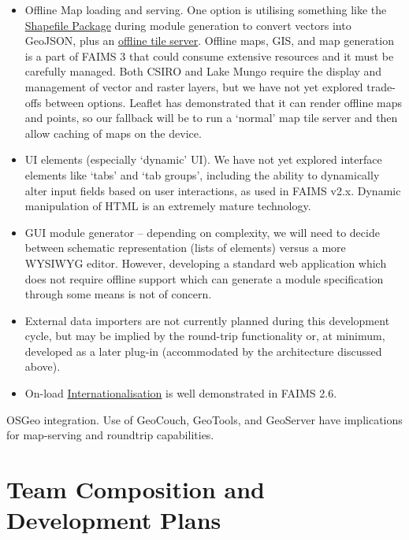 \documentclass{faims3_report}
\begin{document}
\begin{itemize}
\item Offline Map loading and serving. One option is utilising something
  like the \href{https://www.npmjs.com/package/shapefile}{{Shapefile
  Package}} during module generation to convert vectors into GeoJSON,
  plus an \href{https://www.npmjs.com/package/mapeo-server}{{offline
  tile server}}. Offline maps, GIS, and map generation is a part of
  FAIMS 3 that could consume extensive resources and it must be
  carefully managed. Both CSIRO and Lake Mungo require the display and
  management of vector and raster layers, but we have not yet explored
  trade-offs between options. Leaflet has demonstrated that it can
  render offline maps and points, so our fallback will be to run a
  `normal' map tile server and then allow caching of maps on the device.
 
\item UI elements (especially `dynamic' UI). We have not yet explored
  interface elements like `tabs' and `tab groups', including the ability
  to dynamically alter input fields based on user interactions, as used
  in FAIMS v2.x. Dynamic manipulation of HTML is an extremely mature
  technology.
 
\item GUI module generator -- depending on complexity, we will need to
  decide between schematic representation (lists of elements) versus a
  more WYSIWYG editor. However, developing a standard web application
  which does not require offline support which can generate a module
  specification through some means is not of concern.
 
\item External data importers are not currently planned during this
  development cycle, but may be implied by the round-trip functionality
  or, at minimum, developed as a later plug-in (accommodated by the
  architecture discussed above).
 
\item On-load \href{https://react.i18next.com/}{{Internationalisation}} is
  well demonstrated in FAIMS 2.6.
 
\end{itemize}

OSGeo integration. Use of GeoCouch, GeoTools, and GeoServer have
implications for map-serving and roundtrip capabilities.

\chapter{Team Composition and Development
Plans}
\end{document}

